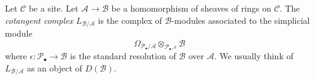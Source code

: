 \begin{definition}
\label{definition-cotangent-complex-morphism-sheaves-rings}
Let $\mathcal{C}$ be a site.
Let $\mathcal{A} \to \mathcal{B}$ be a homomorphism of sheaves of rings
on $\mathcal{C}$.
The {\it cotangent complex} $L_{\mathcal{B}/\mathcal{A}}$
is the complex of $\mathcal{B}$-modules associated to the
simplicial module
$$
\Omega_{\mathcal{P}_\bullet/\mathcal{A}}
\otimes_{\mathcal{P}_\bullet, \epsilon} \mathcal{B}
$$
where $\epsilon : \mathcal{P}_\bullet \to \mathcal{B}$
is the standard resolution of $\mathcal{B}$ over
$\mathcal{A}$. We usually think of $L_{\mathcal{B}/\mathcal{A}}$
as an object of $D(\mathcal{B})$.
\end{definition}
